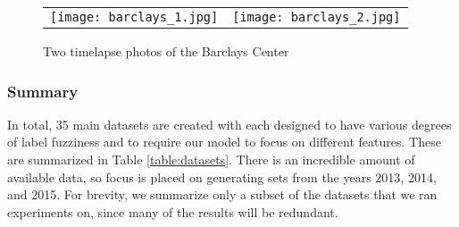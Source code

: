 	\begin{figure}[!htbp]
		\centering
		\begin{tabular}{cc}
			\texttt{[image: barclays\_1.jpg]}  &       \texttt{[image: barclays\_2.jpg]}  \\
			\end{tabular}
		\caption{Two timelapse photos of the Barclays Center}
	\label{fig:timelapse}
\end{figure}
\subsubsection{Summary}
In total, 35 main datasets are created with each designed to have various degrees of label fuzziness and to require our model to focus on different features. These are summarized in Table \ref{table:datasets}. There is an incredible amount of available data, so focus is placed on generating sets from the years 2013, 2014, and 2015. For brevity, we summarize only a subset of the datasets that we ran experiments on, since many of the results will be redundant. 

